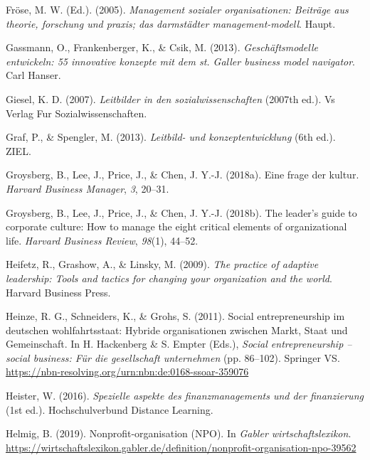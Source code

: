 \documentclass[
  letterpaper,
]{book}
\newlength{\cslhangindent}
\newenvironment{CSLReferences}[2] %
 {\begin{list}{}{%
  \setlength{\itemindent}{0pt}
  \setlength{\leftmargin}{0pt}
  \setlength{\parsep}{0pt}
  \ifodd #1
   \setlength{\leftmargin}{\cslhangindent}
   \setlength{\itemindent}{-1\cslhangindent}
  \fi
  \setlength{\itemsep}{#2\baselineskip}}}
 {\end{list}}
\begin{document}
\begin{CSLReferences}{1}{0}
Fröse, M. W. (Ed.). (2005). \emph{Management sozialer organisationen:
Beiträge aus theorie, forschung und praxis; das darmstädter
management-modell}. Haupt.

Gassmann, O., Frankenberger, K., \& Csik, M. (2013).
\emph{Geschäftsmodelle entwickeln: 55 innovative konzepte mit dem st.
Galler business model navigator}. Carl Hanser.

Giesel, K. D. (2007). \emph{Leitbilder in den sozialwissenschaften}
(2007th ed.). Vs Verlag Fur Sozialwissenschaften.

Graf, P., \& Spengler, M. (2013). \emph{Leitbild- und
konzeptentwicklung} (6th ed.). ZIEL.

Groysberg, B., Lee, J., Price, J., \& Chen, J. Y.-J. (2018a). Eine frage
der kultur. \emph{Harvard Business Manager}, \emph{3}, 20--31.

Groysberg, B., Lee, J., Price, J., \& Chen, J. Y.-J. (2018b). The
leader's guide to corporate culture: How to manage the eight critical
elements of organizational life. \emph{Harvard Business Review},
\emph{98}(1), 44--52.

Heifetz, R., Grashow, A., \& Linsky, M. (2009). \emph{The practice of
adaptive leadership: Tools and tactics for changing your organization
and the world}. Harvard Business Press.

Heinze, R. G., Schneiders, K., \& Grohs, S. (2011). Social
entrepreneurship im deutschen wohlfahrtsstaat: Hybride organisationen
zwischen {Markt}, {Staat} und {Gemeinschaft}. In H. Hackenberg \& S.
Empter (Eds.), \emph{Social entrepreneurship -- social business: Für die
gesellschaft unternehmen} (pp. 86--102). Springer VS.
\url{https://nbn-resolving.org/urn:nbn:de:0168-ssoar-359076}

Heister, W. (2016). \emph{Spezielle aspekte des finanzmanagements und
der finanzierung} (1st ed.). Hochschulverbund Distance Learning.

Helmig, B. (2019). Nonprofit-organisation (NPO). In \emph{Gabler
wirtschaftslexikon}.
\url{https://wirtschaftslexikon.gabler.de/definition/nonprofit-organisation-npo-39562}


\end{CSLReferences}
\end{document}
